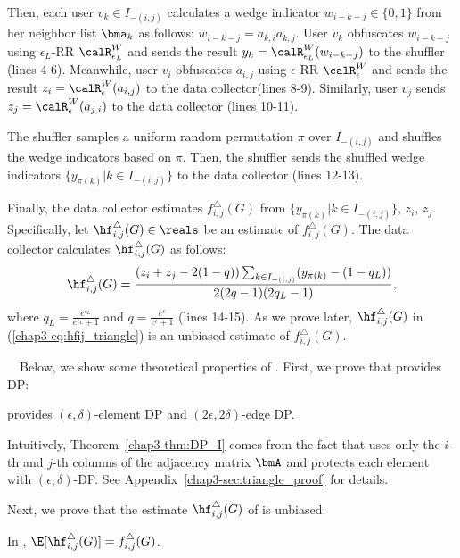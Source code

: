 Then, each user $v_k \in I_{-(i,j)}$ calculates a wedge indicator $w_{i-k-j} \in \{0,1\}$ from her neighbor list $\bma_k$ as follows: $w_{i-k-j} = a_{k,i} a_{k,j}$. 
User $v_k$ obfuscates $w_{i-k-j}$ using $\epsilon_L$-RR $\calR_{\epsilon_L}^W$ and sends the result $y_k = \calR_{\epsilon_L}^W(w_{i-k-j})$ to the shuffler (lines 4-6). 
Meanwhile, user $v_i$ obfuscates $a_{i,j}$ using $\epsilon$-RR $\calR_{\epsilon}^W$ and sends the result $z_i = \calR_{\epsilon}^W(a_{i,j})$ to the data collector\footnotemark[1] (lines 8-9). 
Similarly, user $v_j$ sends $z_j = \calR_{\epsilon}^W(a_{j,i})$ to the data collector (lines 10-11). 

The shuffler samples a uniform random permutation $\pi$ over $I_{-(i,j)}$ and shuffles the wedge indicators based on $\pi$. 
Then, the shuffler sends the shuffled wedge indicators $\{y_{\pi(k)} | k \in I_{-(i,j)}\}$ to the data collector (lines 12-13). 

Finally, the data collector estimates $f_{i,j}^\triangle(G)$ from $\{y_{\pi(k)} | k \in I_{-(i,j)}\}$, $z_i$, $z_j$. 
Specifically, let $\hf_{i,j}^\triangle(G) \in \reals$ be an estimate of $f_{i,j}^\triangle(G)$. 
The data collector calculates $\hf_{i,j}^\triangle(G)$ as follows: 
\begin{align}
    \hf_{i,j}^\triangle(G) = \frac{(z_i+z_j-2(1-q))\sum_{k \in I_{-(i,j)}} (y_{\pi(k)} - (1-q_L))}{2(2q-1)(2q_L-1)},
    \label{chap3-eq:hfij_triangle}
\end{align}
where $q_L = \frac{e^{\epsilon_L}}{e^{\epsilon_L}+1}$ and $q = \frac{e^\epsilon}{e^\epsilon+1}$ (lines 14-15). 
As we prove later, $\hf_{i,j}^\triangle(G)$ in (\ref{chap3-eq:hfij_triangle}) is an unbiased estimate of $f_{i,j}^\triangle(G)$. 

\smallskip
{}~~Below, we show some theoretical properties of \AlgWS{}. 
First, we prove that \AlgWS{} provides DP: 
\begin{theorem}
\label{chap3-thm:DP_I}
\AlgWS{} provides $(\epsilon, \delta)$-element DP and $(2\epsilon, 2\delta)$-edge DP. 
\end{theorem}
Intuitively, Theorem~\ref{chap3-thm:DP_I} comes from the fact that \AlgWS{} uses only the $i$-th and $j$-th columns of the adjacency matrix $\bmA$ and protects each element with $(\epsilon,\delta)$-DP. 
See Appendix~\ref{chap3-sec:triangle_proof} for details. 

Next, we prove that the estimate $\hf_{i,j}^\triangle(G)$ of \AlgWS{} is unbiased: 
\begin{theorem}
\label{chap3-thm:unbiased_I}
In \AlgWS{}, $\E[\hf_{i,j}^\triangle(G)] = f_{i,j}^\triangle(G)$. 
\end{theorem}

